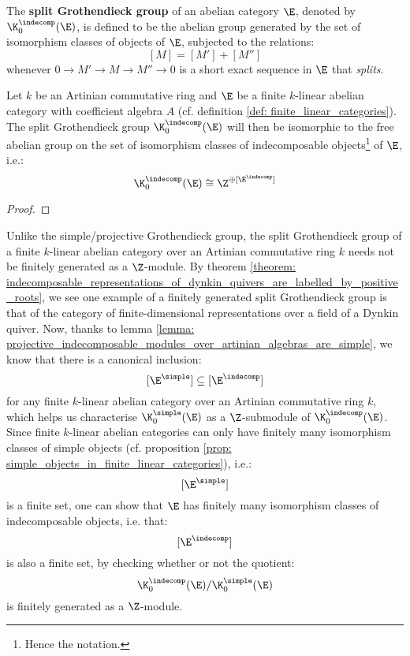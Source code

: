 
            
            \begin{definition} \label{def: split_grothendieck_groups}
                The \textbf{split Grothendieck group} of an abelian category $\E$, denoted by $\K_0^{\indecomp}(\E)$, is defined to be the abelian group generated by the set of isomorphism classes of objects of $\E$, subjected to the relations:
                    $$[M] = [M'] + [M'']$$
                whenever $0 \to M' \to M \to M'' \to 0$ is a short exact sequence in $\E$ that \textit{splits}.
            \end{definition}
            \begin{proposition} \label{prop: split_grothendieck_groups_of_finite_linear_abelian_categories_are_free_on_indecomposable_objects} 
                Let $k$ be an Artinian commutative ring and $\E$ be a finite $k$-linear abelian category with coefficient algebra $A$ (cf. definition \ref{def: finite_linear_categories}). The split Grothendieck group $\K_0^{\indecomp}(\E)$ will then be isomorphic to the free abelian group on the set of isomorphism classes of indecomposable objects\footnote{Hence the notation.} of $\E$, i.e.:
                    $$\K_0^{\indecomp}(\E) \cong \Z^{\oplus [\E^{\indecomp}]}$$
            \end{proposition}
                \begin{proof}
                    
                \end{proof}
            \begin{remark} \label{remark: finiteness_of_split_grothendieck_groups}
                Unlike the simple/projective Grothendieck group, the split Grothendieck group of a finite $k$-linear abelian category over an Artinian commutative ring $k$ needs not be finitely generated as a $\Z$-module. By theorem \ref{theorem: indecomposable_representations_of_dynkin_quivers_are_labelled_by_positive_roots}, we see one example of a finitely generated split Grothendieck group is that of the category of finite-dimensional representations over a field of a Dynkin quiver. Now, thanks to lemma \ref{lemma: projective_indecomposable_modules_over_artinian_algebras_are_simple}, we know that there is a canonical inclusion:
                    $$[\E^{\simple}] \subseteq [\E^{\indecomp}]$$
                for any finite $k$-linear abelian category over an Artinian commutative ring $k$, which helps us characterise $\K_0^{\simple}(\E)$ as a $\Z$-submodule of $\K_0^{\indecomp}(\E)$. Since finite $k$-linear abelian categories can only have finitely many isomorphism classes of simple objects (cf. proposition \ref{prop: simple_objects_in_finite_linear_categories}), i.e.:
                    $$[\E^{\simple}]$$
                is a finite set, one can show that $\E$ has finitely many isomorphism classes of indecomposable objects, i.e. that:
                    $$[\E^{\indecomp}]$$
                is also a finite set, by checking whether or not the quotient:
                    $$\K_0^{\indecomp}(\E)/\K_0^{\simple}(\E)$$
                is finitely generated as a $\Z$-module. 
            \end{remark}